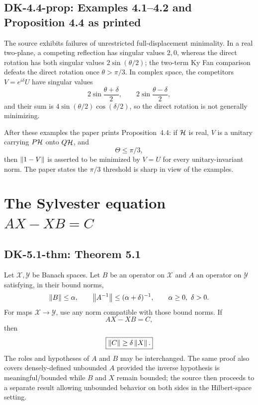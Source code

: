 \subsection*{DK-4.4-prop: Examples 4.1--4.2 and Proposition 4.4 as printed}
The source exhibits failures of unrestricted full-displacement minimality.  In a real two-plane, a competing reflection has singular values $2,0$, whereas the direct rotation has both singular values $2\sin(\theta/2)$; the two-term Ky Fan comparison defeats the direct rotation once $\theta>\pi/3$.  In complex space, the competitors $V=e^{i\delta}U$ have singular values
\[
 2\sin\frac{\theta+\delta}{2},\qquad
 2\sin\frac{\theta-\delta}{2},
\]
and their sum is $4\sin(\theta/2)\cos(\delta/2)$, so the direct rotation is not generally minimizing.

After these examples the paper prints Proposition~4.4: if $\mathcal{H}$ is real, $V$ is a unitary carrying $P\mathcal{H}$ onto $Q\mathcal{H}$, and
\[
 \Theta\le\pi/3,
\]
then $\left\lVert 1-V\right\rVert$ is asserted to be minimized by $V=U$ for every unitary-invariant norm.  The paper states the $\pi/3$ threshold is sharp in view of the examples.

\section{The Sylvester equation $AX-XB=C$}

\subsection*{DK-5.1-thm: Theorem 5.1}
Let $\mathcal X,\mathcal Y$ be Banach spaces.  Let $B$ be an operator on $\mathcal X$ and $A$ an operator on $\mathcal Y$ satisfying, in their bound norms,
\[
 \left\lVert B\right\rVert\le\alpha,
 \qquad
 \left\lVert A^{-1}\right\rVert\le(\alpha+\delta)^{-1},
 \qquad \alpha\ge0,\ \delta>0.
\]
For maps $\mathcal X\to\mathcal Y$, use any norm compatible with those bound norms.  If
\[
 AX-XB=C,
\]
then
\[
 \boxed{\left\lVert C\right\rVert\ge\delta\left\lVert X\right\rVert.}
\]
The roles and hypotheses of $A$ and $B$ may be interchanged.  The same proof also covers densely-defined unbounded $A$ provided the inverse hypothesis is meaningful/bounded while $B$ and $X$ remain bounded; the source then proceeds to a separate result allowing unbounded behavior on both sides in the Hilbert-space setting.

